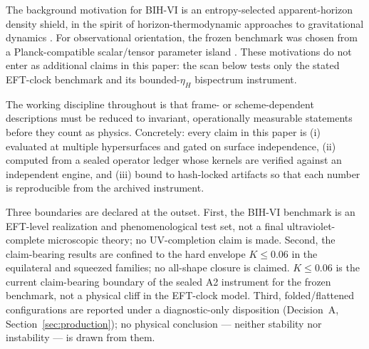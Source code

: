 \documentclass[11pt]{article}
\begin{document}
The background motivation for BIH-VI is an entropy-selected apparent-horizon density shield, in the
spirit of horizon-thermodynamic approaches to gravitational dynamics \cite{jacobson1995,hayward1998}.
For observational orientation, the frozen benchmark was chosen from a Planck-compatible scalar/tensor
parameter island \cite{planck2018params}. These motivations do not enter as additional claims in this
paper: the scan below tests only the stated EFT-clock benchmark and its bounded-$\eta_H$ bispectrum
instrument.

The working discipline throughout is that frame- or scheme-dependent descriptions must be reduced
to invariant, operationally measurable statements before they count as physics. Concretely: every
claim in this paper is (i) evaluated at multiple hypersurfaces and gated on surface independence,
(ii) computed from a sealed operator ledger whose kernels are verified against an independent
engine, and (iii) bound to hash-locked artifacts so that each number is reproducible from the
archived instrument.

Three boundaries are declared at the outset. First, the BIH-VI benchmark is an EFT-level
realization and phenomenological test set, not a final ultraviolet-complete microscopic theory; no
UV-completion claim is made. Second, the claim-bearing results are confined to the hard envelope
$K \leq 0.06$ in the equilateral and squeezed families; no all-shape closure is claimed.
$K \leq 0.06$ is the current claim-bearing boundary of the sealed A2 instrument for the frozen
benchmark, not a physical cliff in the EFT-clock model. Third,
folded/flattened configurations are reported under a diagnostic-only disposition (Decision~A,
Section~\ref{sec:production}); no physical conclusion --- neither stability nor instability --- is
drawn from them.
\end{document}
